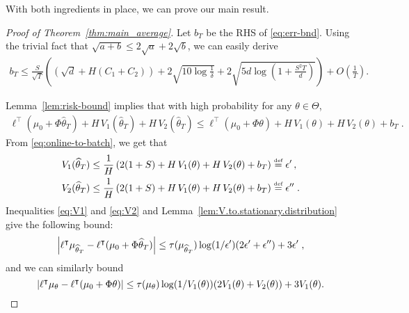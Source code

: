 \documentclass[11pt]{article}
\newcommand{\df}{\stackrel{\mbox{\rm\tiny def}}{=}}
\begin{document}
With both ingredients in place, we can prove our main result.
\begin{proof}[Proof of Theorem~\ref{thm:main_average}]
Let $b_T$ be the RHS of \eqref{eq:err-bnd}. Using the trivial fact that $\sqrt{a+b}\leq 2\sqrt{a}+2\sqrt{b}$,
we can easily derive
\begin{align}
  b_T
  \le
  \frac{S}{\sqrt{T}}
  \left(
  (\sqrt{d} + H (C_1 + C_2))
  + 2\sqrt{10 \log\frac{1}{\delta}}
  +2\sqrt{5d \log \left( 1 + \frac{S^2 T}{d} \right)} \right)
  + O\left(\frac{1}{T}\right).
\end{align}

Lemma~\ref{lem:risk-bound} implies that with high probability for any $\theta\in\Theta$,
\begin{align}
\label{eq:online-to-batch}
\ell^\top (\mu_0 + \Phi \widehat \theta_T) + H\, V_1(\widehat\theta_T) + H\, V_2(\widehat\theta_T) \le \ell^\top (\mu_0 + \Phi\theta)+ H\, V_1(\theta)  + H\, V_2(\theta) + b_T\; .
\end{align}
From \eqref{eq:online-to-batch}, we get that
\begin{align}
\label{eq:V1}
V_1(\widehat \theta_T) &\le \frac{1}{H} \left( 2(1+S) + H\, V_1(\theta)  + H\, V_2(\theta)+ b_T \right) \df \epsilon' \,, \\
\label{eq:V2}
V_2(\widehat \theta_T) &\le \frac{1}{H} \left( 2(1+S) + H\, V_1(\theta)  + H\, V_2(\theta) + b_T \right) \df \epsilon'' \; .
\end{align}
Inequalities \eqref{eq:V1} and \eqref{eq:V2} and Lemma~\ref{lem:V.to.stationary.distribution} give the following bound:
\begin{equation}
\left\vert \ell^\intercal\mu_{\widehat\theta_T} - \ell^\intercal(\mu_0 + \Phi \widehat\theta_T)\right\vert \le
\tau(\mu_{\widehat\theta_T}) \log(1/\epsilon') (2\epsilon'+\epsilon'') + 3\epsilon' \; ,
\end{equation}
and we can similarly bound
\begin{equation}
\left\vert \ell^\intercal\mu_{\theta} - \ell^\intercal(\mu_0 + \Phi \theta)\right\vert \le
\tau(\mu_{\theta}) \log(1/V_1(\theta)) (2V_1(\theta) + V_2(\theta)) + 3V_1(\theta).
\end{equation}


\end{proof}
\end{document}
